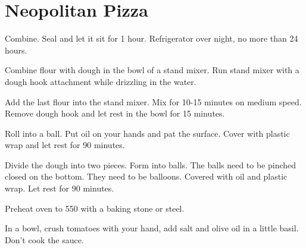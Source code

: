 \section{Neopolitan Pizza}
\begin{recipe}



Combine. Seal and let it sit for 1 hour. Refrigerator over night, no more than 24 hours. 


Combine flour with dough in the bowl of a stand mixer. Run stand mixer with a dough hook attachment while drizzling in the water. 


Add the last flour into the stand mixer. Mix for 10-15 minutes on medium speed. Remove dough hook and let rest in the bowl for 15 minutes. 

Roll into a ball. Put oil on your hands and pat the surface. Cover with plastic wrap and let rest for 90 minutes. 

Divide the dough into two pieces. Form into balls. The balls need to be pinched closed on the bottom. They need to be balloons. Covered with oil and plastic wrap. Let rest for 90 minutes. 

Preheat oven to 550\degree{} with a baking stone or steel. 


In a bowl, crush tomatoes with your hand, add salt and olive oil in a little basil. Don't cook the sauce.


\end{recipe}
